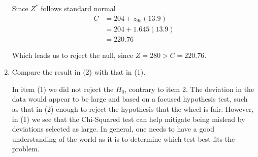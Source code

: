 \documentclass{tufte-book}
\theoremstyle{mytheoremstyle}
\theoremstyle{mylemstyle}
\theoremstyle{mydefstyle}
\begin{document}
\begin{enumerate}
Since $Z^*$ follows standard normal
\begin{align*}
C &= 204 + z_{95}(13.9)\\
&= 204 + 1.645(13.9)\\
&= 220.76
\end{align*}

Which leads us to reject the null, since $Z=280 > C=220.76$.

\item Compare the result in (2) with that in (1).

In item (1) we did not reject the $H_0$, contrary to item 2.  The deviation in the data would appear to be large and based on a focused hypothesis test, such as that in (2) enough to reject the hypothesis that the wheel is fair.  However, in (1) we see that the Chi-Squared test can help mitigate being mislead by deviations selected as large.  In general, one needs to have a good understanding of the world as it is to determine which test best fits the problem.
\end{enumerate}
\end{document}

